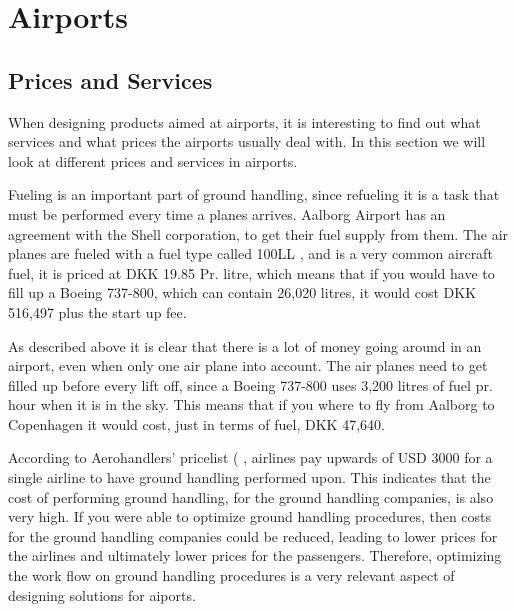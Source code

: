 \chapter{Airports}
\section{Prices and Services}
When designing products aimed at airports, it is interesting to find out what services and what prices the airports usually deal with. In this section we will look at different prices and services in airports.


Fueling is an important part of ground handling, since refueling it is a task that must be performed every time a planes arrives. Aalborg Airport has an agreement with the Shell corporation, to get their fuel supply from them. The air planes are fueled with a fuel type called 100LL \cite{iaopa_fuelprices}, and is a very common aircraft fuel, it is priced at DKK 19.85 Pr. litre, which means that if you would have to fill up a Boeing 737-800, which can contain 26,020 litres\cite{737_specs}, it would cost DKK 516,497 plus the start up fee.

As described above it is clear that there is a lot of money going around in an airport, even when only one air plane into account. The air planes need to get filled up before every lift off, since a Boeing 737-800 uses 3,200 litres of fuel pr. hour when it is in the sky. This means that if you where to fly from Aalborg to Copenhagen it would cost, just in terms of fuel, DKK 47,640.


According to Aerohandlers' pricelist (%
, airlines pay upwards of USD 3000 for a single airline to have ground handling performed upon. This indicates that the cost of performing ground handling, for the ground handling companies, is also very high. If you were able to optimize ground handling procedures, then costs for the ground handling companies could be reduced, leading to lower prices for the airlines and ultimately lower prices for the passengers. Therefore, optimizing the work flow on ground handling procedures is a very relevant aspect of designing solutions for aiports.